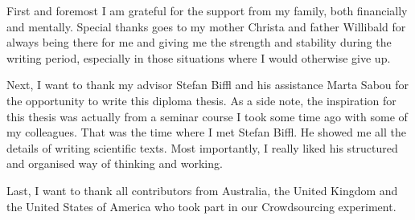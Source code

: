 \begin{acknowledgements*}
First and foremost I am grateful for the support from my family, both financially and mentally. Special thanks goes to my mother Christa and father Willibald for always being there for me and giving me the strength and stability during the writing period, especially in those situations where I would otherwise give up.

Next, I want to thank my advisor Stefan Biffl and his assistance Marta Sabou for the opportunity to write this diploma thesis. As a side note, the inspiration for this thesis was actually from a seminar course I took some time ago with some of my colleagues. That was the time where I met Stefan Biffl. He showed me all the details of writing scientific texts. Most importantly, I really liked his structured and organised way of thinking and working. 

Last, I want to thank all contributors from Australia, the United Kingdom and the United States of America who took part in our Crowdsourcing experiment.

\end{acknowledgements*}